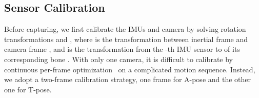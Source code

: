 \documentclass[letterpaper]{article} \usepackage{aaai23}  \usepackage{times}  \usepackage{helvet}  \usepackage{courier}  \usepackage[hyphens]{url}  \usepackage{graphicx} \urlstyle{rm} \def\UrlFont{\rm}  \usepackage{natbib}  \usepackage{caption} \frenchspacing  \setlength{\pdfpagewidth}{8.5in}  \setlength{\pdfpageheight}{11in}  \usepackage{algorithm}
\begin{document}
\begin{table*}[th]
	\begin{center}
		\centering
\caption{HCM dataset is a new largest multi-modal human motion dataset recorded from the most camera views and IMUs, providing pre-scanned templates of daily clothing actors, paired music, and the most images and inertial measurements.
		}
		\label{tab:dataset}
		\vspace{2mm}
	\end{center}
\end{table*}

\subsection{Sensor Calibration}
Before capturing, we first calibrate the IMUs and camera by solving rotation transformations  and , where  is the transformation between inertial frame  and camera frame , and  is the transformation from the -th IMU sensor  to  of its corresponding bone . 
With only one camera, it is difficult to calibrate by continuous per-frame optimization~\cite{Zheng2018HybridFusion} on a complicated motion sequence. 
Instead, we adopt a two-frame calibration strategy, one frame for A-pose and the other one for T-pose.
\end{document}
